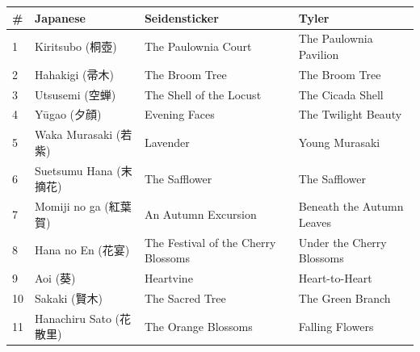 \documentclass{article}
\begin{document}
\clearpage




\begin{table}
	\centering
	\begin{tabular}{llll}
		\textbf{\#} & \textbf{Japanese}      & \textbf{Seidensticker}              & \textbf{Tyler}                \\
		\hline%
		\noalign{\vskip 1mm}%
		1           & Kiritsubo (桐壺)         & The Paulownia Court                 & The Paulownia Pavilion        \\
		2           & Hahakigi (帚木)          & The Broom Tree                      & The Broom Tree                \\
		3           & Utsusemi (空蝉)          & The Shell of the Locust             & The Cicada Shell              \\
		4           & Yūgao (夕顔)             & Evening Faces                       & The Twilight Beauty           \\
		5           & Waka Murasaki (若紫)     & Lavender                            & Young Murasaki                \\
		6           & Suetsumu Hana (末摘花)    & The Safflower                       & The Safflower                 \\
		7           & Momiji no ga (紅葉賀)     & An Autumn Excursion                 & Beneath the Autumn Leaves     \\
		8           & Hana no En (花宴)        & The Festival of the Cherry Blossoms & Under the Cherry Blossoms     \\
		9           & Aoi (葵)                & Heartvine                           & Heart-to-Heart                \\
		10          & Sakaki (賢木)            & The Sacred Tree                     & The Green Branch              \\
		11          & Hanachiru Sato (花散里)   & The Orange Blossoms                 & Falling Flowers               \\

\end{tabular}
\end{table}
\end{document}
